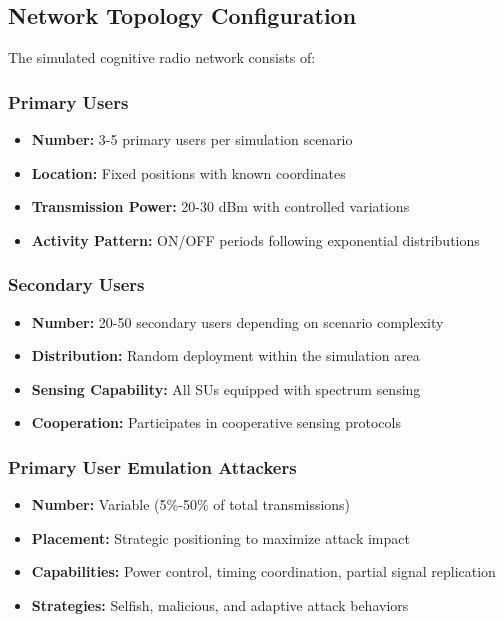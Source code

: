 \subsection{Network Topology Configuration}
The simulated cognitive radio network consists of:

\subsubsection{Primary Users}
\begin{itemize}
\item \textbf{Number:} 3-5 primary users per simulation scenario
\item \textbf{Location:} Fixed positions with known coordinates
\item \textbf{Transmission Power:} 20-30 dBm with controlled variations
\item \textbf{Activity Pattern:} ON/OFF periods following exponential distributions
\end{itemize}

\subsubsection{Secondary Users}
\begin{itemize}
\item \textbf{Number:} 20-50 secondary users depending on scenario complexity
\item \textbf{Distribution:} Random deployment within the simulation area
\item \textbf{Sensing Capability:} All SUs equipped with spectrum sensing
\item \textbf{Cooperation:} Participates in cooperative sensing protocols
\end{itemize}

\subsubsection{Primary User Emulation Attackers}
\begin{itemize}
\item \textbf{Number:} Variable (5\%-50\% of total transmissions)
\item \textbf{Placement:} Strategic positioning to maximize attack impact
\item \textbf{Capabilities:} Power control, timing coordination, partial signal replication
\item \textbf{Strategies:} Selfish, malicious, and adaptive attack behaviors
\end{itemize}

